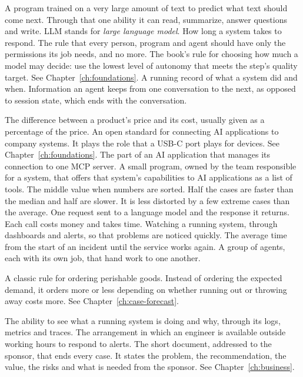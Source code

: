\begin{description}[style=nextline, leftmargin=1.2em, itemsep=4pt, font=\normalfont\bfseries\sffamily\small]
 A program trained on a very large amount of text to predict what text should come next. Through that one ability it can read, summarize, answer questions and write. LLM stands for \emph{large language model}.
 How long a system takes to respond.
 The rule that every person, program and agent should have only the permissions its job needs, and no more.
 The book's rule for choosing how much a model may decide: use the lowest level of autonomy that meets the step's quality target. See Chapter~\ref{ch:foundations}.
 A running record of what a system did and when.
 Information an agent keeps from one conversation to the next, as opposed to session state, which ends with the conversation.

 The difference between a product's price and its cost, usually given as a percentage of the price.
 An open standard for connecting AI applications to company systems. It plays the role that a USB-C port plays for devices. See Chapter~\ref{ch:foundations}.
 The part of an AI application that manages its connection to one MCP server.
 A small program, owned by the team responsible for a system, that offers that system's capabilities to AI applications as a list of tools.
 The middle value when numbers are sorted. Half the cases are faster than the median and half are slower. It is less distorted by a few extreme cases than the average.
 One request sent to a language model and the response it returns. Each call costs money and takes time.
 Watching a running system, through dashboards and alerts, so that problems are noticed quickly.
 The average time from the start of an incident until the service works again.
 A group of agents, each with its own job, that hand work to one another.

 A classic rule for ordering perishable goods. Instead of ordering the expected demand, it orders more or less depending on whether running out or throwing away costs more. See Chapter~\ref{ch:case-forecast}.

 The ability to see what a running system is doing and why, through its logs, metrics and traces.
 The arrangement in which an engineer is available outside working hours to respond to alerts.
 The short document, addressed to the sponsor, that ends every case. It states the problem, the recommendation, the value, the risks and what is needed from the sponsor. See Chapter~\ref{ch:business}.


\end{description}
